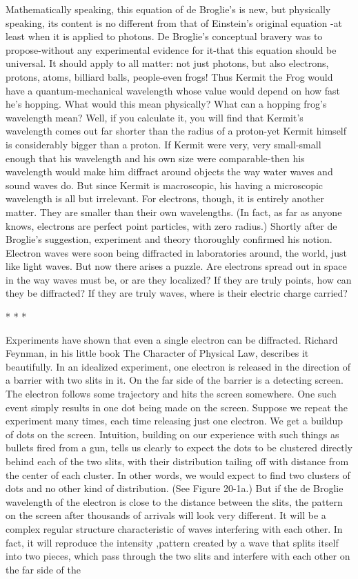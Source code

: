Mathematically speaking, this equation of de Broglie's is new, but physically
speaking, its content is no different from that of Einstein's original equation -at least
when it is applied to photons. De Broglie's conceptual bravery was to propose-without
any experimental evidence for it-that this equation should be universal. It should
apply to all matter: not just photons, but also electrons, protons, atoms, billiard balls,
people-even frogs! Thus Kermit the Frog would have a quantum-mechanical
wavelength whose value would depend on how fast he's hopping.
        What would this mean physically? What can a hopping frog's wavelength
mean? Well, if you calculate it, you will find that Kermit's wavelength comes out far
shorter than the radius of a proton-yet Kermit himself is considerably bigger than a
proton. If Kermit were very, very small-small enough that his wavelength and his own
size were comparable-then his wavelength would make him diffract around objects
the way water waves and sound waves do. But since Kermit is macroscopic, his
having a microscopic wavelength is all but irrelevant.
        For electrons, though, it is entirely another matter. They are smaller than their
own wavelengths. (In fact, as far as anyone knows, electrons are perfect point
particles, with zero radius.) Shortly after de Broglie's suggestion, experiment and
theory thoroughly confirmed his notion. Electron waves were soon being diffracted in
laboratories around, the world, just like light waves. But now there arises a puzzle.
Are electrons spread out in space in the way waves must be, or are they localized? If
they are truly points, how can they be diffracted? If they are truly waves, where is
their electric charge carried?

                                        *   *   *

Experiments have shown that even a single electron can be diffracted. Richard
Feynman, in his little book The Character of Physical Law, describes it beautifully. In
an idealized experiment, one electron is released in the direction of a barrier with two
slits in it. On the far side of the barrier is a detecting screen. The electron follows
some trajectory and hits the screen somewhere. One such event simply results in one
dot being made on the screen. Suppose we repeat the experiment many times, each
time releasing just one electron. We get a buildup of dots on the screen. Intuition,
building on our experience with such things as bullets fired from a gun, tells us clearly
to expect the dots to be clustered directly behind each of the two slits, with their
distribution tailing off with distance from the center of each cluster. In other words,
we would expect to find two clusters of dots and no other kind of distribution. (See
Figure 20-1a.)
         But if the de Broglie wavelength of the electron is close to the distance
between the slits, the pattern on the screen after thousands of arrivals will look very
different. It will be a complex regular structure characteristic of waves interfering
with each other. In fact, it will reproduce the intensity ,pattern created by a wave that
splits itself into two pieces, which pass through the two slits and interfere with each
other on the far side of the




